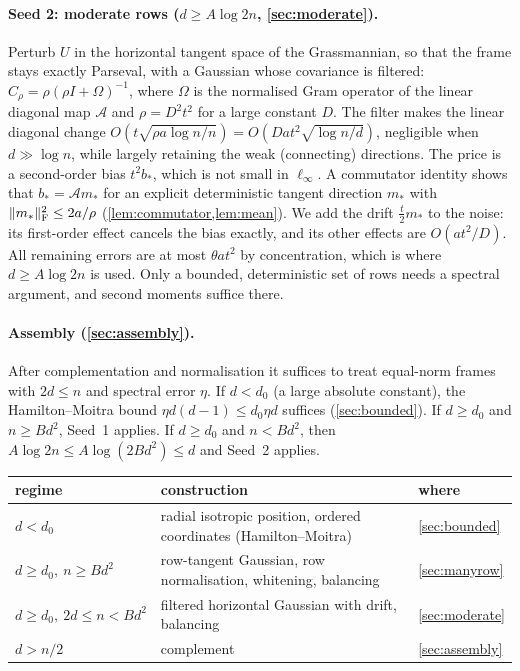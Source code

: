 \paragraph{Seed 2: moderate rows ($d\ge A\log 2n$, \cref{sec:moderate}).}
Perturb $U$ in the horizontal tangent space of the Grassmannian, so that the
frame stays exactly Parseval, with a Gaussian whose covariance is filtered:
$C_\rho=\rho(\rho I+\Omega)^{-1}$, where $\Omega$ is the normalised
Gram operator of the linear diagonal map $\mathcal A$ and $\rho=D^2t^2$ for a
large constant $D$. The filter makes the linear diagonal change
$O(t\sqrt{\rho a\log n/n})=O(Dat^2\sqrt{\log n/d})$, negligible when
$d\gg\log n$, while largely retaining the weak (connecting) directions. The
price is a second-order bias $t^2b_*$, which is not small in $\ell_\infty$. A
commutator identity shows that $b_*=\mathcal Am_*$ for an explicit
deterministic tangent direction $m_*$ with $\lVert m_*\rVert_{\mathrm F}^2\le2a/\rho$
(\cref{lem:commutator,lem:mean}). We add the drift $\frac t2m_*$ to the noise:
its first-order effect cancels the bias exactly, and its other effects are
$O(at^2/D)$. All remaining errors are at most $\theta at^2$ by concentration,
which is where $d\ge A\log 2n$ is used. Only a bounded, deterministic set of
rows needs a spectral argument, and second moments suffice there.

\paragraph{Assembly (\cref{sec:assembly}).}
After complementation and normalisation it suffices to treat equal-norm frames
with $2d\le n$ and spectral error $\eta$. If $d<d_0$ (a large absolute
constant), the Hamilton--Moitra bound $\eta d(d-1)\le d_0\eta d$ suffices
(\cref{sec:bounded}). If $d\ge d_0$ and $n\ge Bd^2$, Seed~1 applies. If
$d\ge d_0$ and $n<Bd^2$, then $A\log 2n\le A\log(2Bd^2)\le d$ and Seed~2
applies.

\begin{center}
\small
\begin{tabular}{@{}lll@{}}
\toprule
regime & construction & where\\
\midrule
$d<d_0$ & radial isotropic position, ordered coordinates (Hamilton--Moitra) & \cref{sec:bounded}\\
$d\ge d_0,\ n\ge Bd^2$ & row-tangent Gaussian, row normalisation, whitening, balancing & \cref{sec:manyrow}\\
$d\ge d_0,\ 2d\le n<Bd^2$ & filtered horizontal Gaussian with drift, balancing & \cref{sec:moderate}\\
$d>n/2$ & complement & \cref{sec:assembly}\\
\bottomrule
\end{tabular}
\end{center}
